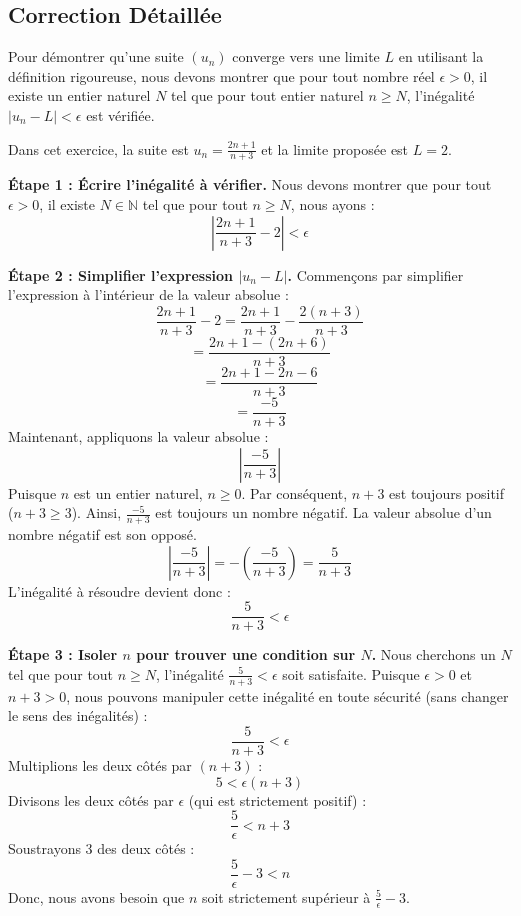 \documentclass[a4paper,11pt]{report}
\begin{document}
\subsection*{Correction Détaillée}
Pour démontrer qu'une suite $(u_n)$ converge vers une limite $L$ en utilisant la définition rigoureuse, nous devons montrer que pour tout nombre réel $\epsilon > 0$, il existe un entier naturel $N$ tel que pour tout entier naturel $n \ge N$, l'inégalité $|u_n - L| < \epsilon$ est vérifiée.

Dans cet exercice, la suite est $u_n = \frac{2n+1}{n+3}$ et la limite proposée est $L=2$.

\textbf{Étape 1 : Écrire l'inégalité à vérifier.}
Nous devons montrer que pour tout $\epsilon > 0$, il existe $N \in \mathbb{N}$ tel que pour tout $n \ge N$, nous ayons :
$$ \left| \frac{2n+1}{n+3} - 2 \right| < \epsilon $$

\textbf{Étape 2 : Simplifier l'expression $|u_n - L|$.}
Commençons par simplifier l'expression à l'intérieur de la valeur absolue :
$$ \frac{2n+1}{n+3} - 2 = \frac{2n+1}{n+3} - \frac{2(n+3)}{n+3} $$
$$ = \frac{2n+1 - (2n+6)}{n+3} $$
$$ = \frac{2n+1 - 2n - 6}{n+3} $$
$$ = \frac{-5}{n+3} $$
Maintenant, appliquons la valeur absolue :
$$ \left| \frac{-5}{n+3} \right| $$
Puisque $n$ est un entier naturel, $n \ge 0$. Par conséquent, $n+3$ est toujours positif ($n+3 \ge 3$).
Ainsi, $\frac{-5}{n+3}$ est toujours un nombre négatif. La valeur absolue d'un nombre négatif est son opposé.
$$ \left| \frac{-5}{n+3} \right| = - \left( \frac{-5}{n+3} \right) = \frac{5}{n+3} $$
L'inégalité à résoudre devient donc :
$$ \frac{5}{n+3} < \epsilon $$

\textbf{Étape 3 : Isoler $n$ pour trouver une condition sur $N$.}
Nous cherchons un $N$ tel que pour tout $n \ge N$, l'inégalité $\frac{5}{n+3} < \epsilon$ soit satisfaite.
Puisque $\epsilon > 0$ et $n+3 > 0$, nous pouvons manipuler cette inégalité en toute sécurité (sans changer le sens des inégalités) :
$$ \frac{5}{n+3} < \epsilon $$
Multiplions les deux côtés par $(n+3)$ :
$$ 5 < \epsilon (n+3) $$
Divisons les deux côtés par $\epsilon$ (qui est strictement positif) :
$$ \frac{5}{\epsilon} < n+3 $$
Soustrayons 3 des deux côtés :
$$ \frac{5}{\epsilon} - 3 < n $$
Donc, nous avons besoin que $n$ soit strictement supérieur à $\frac{5}{\epsilon} - 3$.
\end{document}

